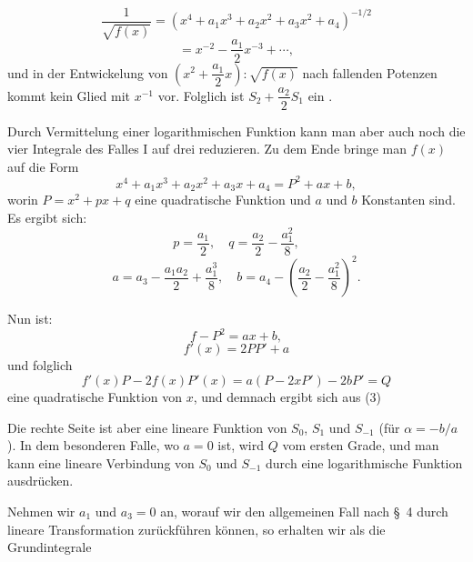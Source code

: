 \[
\frac{1}{\sqrt{f(x)}} = (x^4 + a_1 x^3 + a_2 x^2 + a_3 x^2 + a_4)^{-1/2} %
\]
\[
= x^{-2} - \frac{a_1}{2}x^{-3} + \cdots,
\]
und in der Entwickelung von $\left(x^2 + \dfrac{a_1}{2}x\right):\sqrt{f(x)}$ nach fallenden Potenzen kommt kein Glied mit $x^{-1}$ vor. Folglich ist $S_2 + \dfrac{a_2}{2}S_1$ ein . %

Durch Vermittelung einer logarithmischen Funktion kann man aber auch noch die vier Integrale des Falles I auf drei reduzieren. Zu dem Ende bringe man $f(x)$ auf die Form
\[
x^4 + a_1 x^3 + a_2 x^2 + a_3 x + a_4 = P^2 + ax + b,
\]
worin $P = x^2 + px + q$ eine quadratische Funktion und $a$ und $b$ Konstanten sind. Es ergibt sich:
\[
p = \frac{a_1}{2}, \quad q = \frac{a_2}{2} - \frac{a_1^2}{8},
\]
\[
a = a_3 - \frac{a_1 a_2}{2} + \frac{a_1^3}{8}, \quad b = a_4 - \left(\frac{a_2}{2} - \frac{a_1^2}{8}\right)^2.
\]

Nun ist:
\[
f - P^2 = ax + b,
\]
\[
f'(x) = 2PP' + a
\]
und folglich
\[
f'(x)P - 2f(x)P'(x) = a(P - 2xP') - 2bP' = Q
\]
eine quadratische Funktion von $x$, und demnach ergibt sich aus (3)

Die rechte Seite ist aber eine lineare Funktion von $S_0$, $S_1$ und $S_{-1}$ (f\"ur $\alpha = -b/a$). In dem besonderen Falle, wo $a = 0$ ist, wird $Q$ vom ersten Grade, und man kann eine lineare Verbindung von $S_0$ und $S_{-1}$ durch eine logarithmische Funktion ausdr\"ucken.

Nehmen wir $a_1$ und $a_3 = 0$ an, worauf wir den allgemeinen Fall nach \S\ 4 durch lineare Transformation zur\"uckf\"uhren k\"onnen, so erhalten wir als die Grundintegrale
